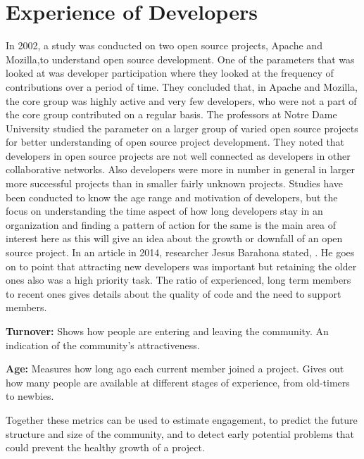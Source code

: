 \documentclass[seploa]{beavtex}
\begin{document}
\section{Experience of Developers}
In 2002, a study was conducted on two open source projects, Apache and Mozilla,to understand open source development. One of the parameters that was looked at was developer participation where they looked at the frequency of contributions over a period of time. They concluded that, in Apache and Mozilla, the core group was highly active and very few developers, who were not a part of the core group contributed on a regular basis\cite{mockus2002}. The professors at Notre Dame University studied the parameter on a larger group of varied open source projects for better understanding of open source project development. They noted that developers in open source projects are not well connected as developers in other collaborative networks. Also developers were more in number in general in larger more successful projects than in smaller fairly unknown projects\cite{greg2002}. Studies have been conducted to know the age range and motivation of developers, but the focus on understanding the time aspect of how long developers stay in an organization and finding a pattern of action for the same is the main area of interest here as this will give an idea about the growth or downfall of an open source project. In an article in 2014\cite{jes2014}, researcher Jesus Barahona stated, . He goes on to point that attracting new developers was important but retaining the older ones also was a high priority task. The ratio of experienced, long term members to recent ones gives details about the quality of code and the need to support members\cite{jes2014}.

\textbf{Turnover:}
Shows how people are entering and leaving the community. An indication of the community's attractiveness.

\textbf{Age:}
Measures how long ago each current member joined a project. Gives out how many people are available at different stages of experience, from old-timers to newbies.

Together these metrics can be used to estimate engagement, to predict the future structure and size of the community, and to detect early potential problems that could prevent the healthy growth of a project\cite{jes2014}.
\end{document}
